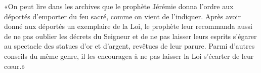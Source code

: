 «On peut lire dans les archives
		que le prophète Jérémie donna l’ordre aux déportés d’emporter du feu sacré,
	comme on vient de l’indiquer.
Après avoir donné aux déportés un exemplaire de la Loi,
	le prophète leur recommanda aussi de ne pas oublier les décrets du Seigneur
	et de ne pas laisser leurs esprits s’égarer
	au spectacle des statues d’or et d’argent, revêtues de leur parure.
Parmi d’autres conseils du même genre,
	il les encouragea à ne pas laisser la Loi s’écarter de leur cœur.»
